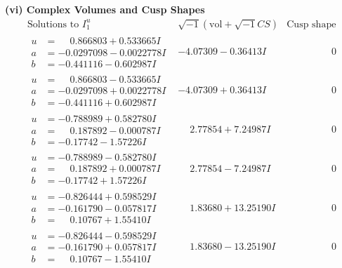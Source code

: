 \documentclass[1p]{elsarticle_modified}
\theoremstyle{definition}
\newcommand{\I}{\sqrt{-1}}
\begin{document}
\newpage\flushleft \textbf{(vi) Complex Volumes and Cusp Shapes}
$$\begin{array}{c|c|c}  
\text{Solutions to }I^u_{1}& \I (\text{vol} + \sqrt{-1}CS) & \text{Cusp shape}\\
 \hline 
\begin{aligned}
u &= \phantom{-}0.866803 + 0.533665 I \\
a &= -0.0297098 - 0.0022778 I \\
b &= -0.441116 - 0.602987 I\end{aligned}
 & -4.07309 - 0.36413 I & \phantom{-0.000000 } 0 \\ \hline\begin{aligned}
u &= \phantom{-}0.866803 - 0.533665 I \\
a &= -0.0297098 + 0.0022778 I \\
b &= -0.441116 + 0.602987 I\end{aligned}
 & -4.07309 + 0.36413 I & \phantom{-0.000000 } 0 \\ \hline\begin{aligned}
u &= -0.788989 + 0.582780 I \\
a &= \phantom{-}0.187892 - 0.000787 I \\
b &= -0.17742 - 1.57226 I\end{aligned}
 & \phantom{-}2.77854 + 7.24987 I & \phantom{-0.000000 } 0 \\ \hline\begin{aligned}
u &= -0.788989 - 0.582780 I \\
a &= \phantom{-}0.187892 + 0.000787 I \\
b &= -0.17742 + 1.57226 I\end{aligned}
 & \phantom{-}2.77854 - 7.24987 I & \phantom{-0.000000 } 0 \\ \hline\begin{aligned}
u &= -0.826444 + 0.598529 I \\
a &= -0.161790 - 0.057817 I \\
b &= \phantom{-}0.10767 + 1.55410 I\end{aligned}
 & \phantom{-}1.83680 + 13.25190 I & \phantom{-0.000000 } 0 \\ \hline\begin{aligned}
u &= -0.826444 - 0.598529 I \\
a &= -0.161790 + 0.057817 I \\
b &= \phantom{-}0.10767 - 1.55410 I\end{aligned}
 & \phantom{-}1.83680 - 13.25190 I & \phantom{-0.000000 } 0 \\ \hline\begin{aligned}

\end{aligned}
\end{array}$$
\end{document}
